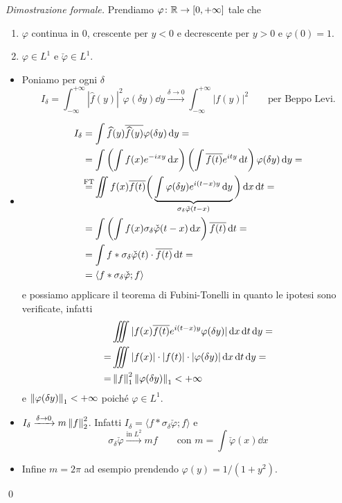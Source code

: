 \textit{Dimostrazione formale.} Prendiamo $\varphi \colon \mathbb R \to [0,+\infty]$ tale che
\begin{enumerate}
	\item $\varphi$ continua in $0$, crescente per $y < 0$ e decrescente per $y > 0$ e $\varphi(0) = 1$.
	\item $\varphi \in L^1$ e $\check\varphi \in L^1$.
\end{enumerate}

\vss

\begin{itemize}

	\item {} 
	Poniamo per ogni $\delta$
	$$
		I_\delta = \int_{-\infty}^{+\infty} |\hat f(y)|^2 \varphi(\delta y) \dd y
		\xrightarrow{\delta \to 0}
		\int_{-\infty}^{+\infty} |f(y)|^2 \qquad \text{per Beppo Levi.}
	$$

	\item {}
		$$
		\begin{aligned}
			I_\delta 
			&= \int \hat f(y) \overline{\hat f(y)} \varphi(\delta y) \dd y = \\
			&= \int \left( \int f(x) e^{-ixy} \dd x \right) \left( \int \overline{f(t)} e^{ity} \dd t \right) \varphi(\delta y) \dd y = \\
			&\overset{\mathclap{\text{FT}}}{=} 
			\iint f(x) \overline{f(t)} 
			\bigg( \underbrace{\int \varphi(\delta y) e^{i(t-x)y} \dd y}_{\sigma_\delta \check \varphi(t - x)} \bigg)
			\dd x \dd t = \\
			&= \int \left( \int f(x) \sigma_\delta \check\varphi(t - x) \dd x \right) \overline{f(t)} \dd t =\\
			&= \int f \ast \sigma_\delta \check \varphi(t) \cdot \overline{f(t)} \dd t = \\
			&= \langle f \ast \sigma_\delta \check \varphi; f \rangle \\
		\end{aligned}
		$$
		e possiamo applicare il teorema di Fubini-Tonelli in quanto le ipotesi sono verificate, infatti
		$$
		\begin{aligned}
			&\iiint |f(x) \overline{f(t)} e^{i(t - x)y} \varphi(\delta y)| \,\mathrm{d} x \,\mathrm{d} t \,\mathrm{d} y = \\
			= &\iiint |f(x)| \cdot |f(t)| \cdot |\varphi(\delta y)| \,\mathrm{d} x \,\mathrm{d} t \,\mathrm{d} y = \\
			= &\left\lVert f \right\rVert_1^2 \left\lVert \varphi(\delta y) \right\rVert_1 < +\infty
		\end{aligned}
		$$
		e $\left\lVert \varphi(\delta y) \right\rVert_1 < +\infty$ poiché $\varphi \in L^1$.

	\item {}
		$I_\delta \xrightarrow{\delta \to 0} m \left\lVert f \right\rVert_2^2 $. Infatti $I_\delta = \langle f \ast \sigma_\delta \check \varphi; f \rangle$ e
		$$
		\sigma_\delta \check \varphi \xrightarrow{\text{in $L^2$}} m f
		\qquad
		\text{con }
		m = \int \check \varphi(x) \dd x
		$$

	\item {}
		Infine $m = 2\pi$ ad esempio prendendo $\varphi(y) = 1/(1+y^2)$.
\end{itemize}
\qed

